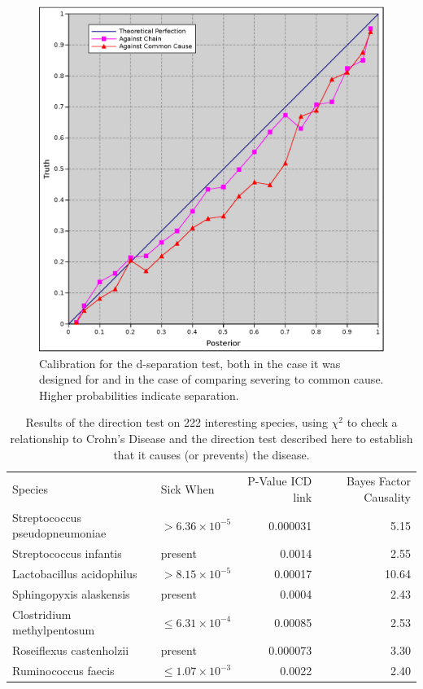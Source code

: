 \documentclass[letterpaper]{article}
\begin{document}
\begin{figure}
  \includegraphics[width=.5\textwidth]{sever}
  \caption{Calibration for the d-separation test, both in the case it was
    designed for and in the case of comparing severing to common
    cause.  Higher probabilities indicate separation.}
  \label{sever}
\end{figure}

\begin{table}[b]
  \begin{tabularx}{\textwidth}{Xlrr}
    Species & Sick When & P-Value ICD link & Bayes Factor Causality \\
    Streptococcus pseudopneumoniae & $>6.36 \times 10^{-5}$ & 0.000031 & 5.15 \\
    Streptococcus infantis & present & 0.0014 & 2.55 \\
    Lactobacillus acidophilus & $>8.15 \times 10^{-5}$ & 0.00017 & 10.64 \\
    Sphingopyxis alaskensis & present & 0.0004 & 2.43 \\
    Clostridium methylpentosum & $\leq 6.31 \times 10^{-4}$ & 0.00085 & 2.53 \\
    Roseiflexus castenholzii & present & 0.000073 & 3.30 \\
    Ruminococcus faecis & $\leq 1.07 \times 10^{-3}$ & 0.0022 & 2.40 \\
  \end{tabularx}
  \caption{Results of the direction test on 222 interesting species,
    using $\chi^2$ to check a relationship to Crohn's Disease and the
    direction test described here to establish that it causes (or
    prevents) the disease.}
  \label{dir_tab}
\end{table}
\end{document}
